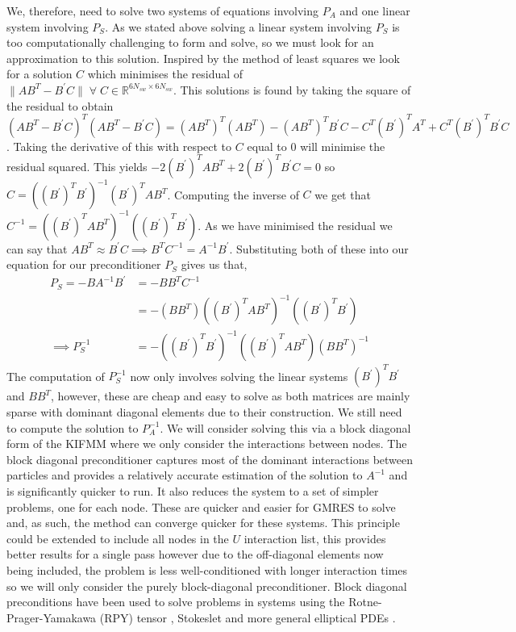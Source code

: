 We, therefore, need to solve two systems of equations involving $P_A$ and one linear system involving $P_S$. As we stated above solving a linear system involving $P_S$ is too computationally challenging to form and solve, so we must look for an approximation to this solution. Inspired by the method of least squares we look for a solution $C$ which minimises the residual of $\lVert AB^T - B^\prime C \rVert \;\forall\; C \in \mathbb{R}^{6N_{sw}\times6N_{sw}}$. This solutions is found by taking the square of the residual to obtain $(AB^T - B^\prime C)^T(AB^T - B^\prime C) = (AB^T)^T(AB^T)-(AB^T)^TB^\prime C-C^T(B^\prime)^TA^T + C^T(B^\prime)^TB^\prime C$. Taking the derivative of this with respect to $C$ equal to $0$ will minimise the residual squared. This yields $-2(B^\prime)^TAB^T + 2(B^\prime)^TB^\prime C=0$ so $C = ((B^\prime)^TB^\prime)^{-1}(B^\prime)^TAB^T$. Computing the inverse of $C$ we get that $C^{-1} = ((B^\prime)^TAB^T)^{-1}((B^\prime)^TB^\prime)$. As we have minimised the residual we can say that $AB^T \approx B^\prime C \implies B^T C^{-1} = A^{-1}B^\prime$. Substituting both of these into our equation for our preconditioner $P_S$ gives us that, 
\begin{equation}
\begin{aligned}
    P_S = - B A^{-1}B^\prime &= -B B^{T} C^{-1} \\
    & = -(B B^{T})((B^\prime)^TAB^T)^{-1}((B^\prime)^TB^\prime) \\
    \implies P_S^{-1} &= -((B^\prime)^TB^\prime)^{-1}((B^\prime)^TAB^T)(B B^{T})^{-1}
\end{aligned}
\label{eq:PreconS}
\end{equation}
The computation of $P_S^{-1}$ now only involves solving the linear systems $(B^\prime)^TB^\prime$ and $B B^{T}$, however, these are cheap and easy to solve as both matrices are mainly sparse with dominant diagonal elements due to their construction. We still need to compute the solution to $P_A^{-1}$. We will consider solving this via a block diagonal form of the KIFMM where we only consider the interactions between nodes. 
The block diagonal preconditioner captures most of the dominant interactions between particles and provides a relatively accurate estimation of the solution to $A^{-1}$ and is significantly quicker to run. It also reduces the system to a set of simpler problems, one for each node. These are quicker and easier for GMRES to solve and, as such, the method can converge quicker for these systems. This principle could be extended to include all nodes in the $U$ interaction list, this provides better results for a single pass however due to the off-diagonal elements now being included, the problem is less well-conditioned with longer interaction times so we will only consider the purely block-diagonal preconditioner. Block diagonal preconditions have been used to solve problems in systems using the Rotne-Prager-Yamakawa (RPY) tensor \cite{UsabiagaHYDRODYNAMICSAPPROACH}, Stokeslet\cite{Nazockdast2017AMechanics} and more general elliptical PDEs \cite{Ibeid2018FastEquations}. 

